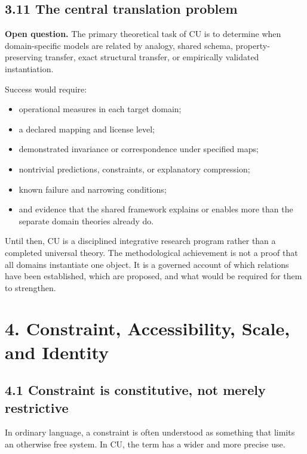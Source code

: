 \documentclass[
  11pt,
]{article}
\providecommand{\tightlist}{%
  \setlength{\itemsep}{0pt}\setlength{\parskip}{0pt}}
\begin{document}
\subsection{3.11 The central translation
problem}\label{the-central-translation-problem}

\textbf{Open question.} The primary theoretical task of CU is to
determine when domain-specific models are related by analogy, shared
schema, property-preserving transfer, exact structural transfer, or
empirically validated instantiation.

Success would require:

\begin{itemize}
\tightlist
\item
  operational measures in each target domain;
\item
  a declared mapping and license level;
\item
  demonstrated invariance or correspondence under specified maps;
\item
  nontrivial predictions, constraints, or explanatory compression;
\item
  known failure and narrowing conditions;
\item
  and evidence that the shared framework explains or enables more than
  the separate domain theories already do.
\end{itemize}

Until then, CU is a disciplined integrative research program rather than
a completed universal theory. The methodological achievement is not a
proof that all domains instantiate one object. It is a governed account
of which relations have been established, which are proposed, and what
would be required for them to strengthen.

\section{4. Constraint, Accessibility, Scale, and
Identity}\label{constraint-accessibility-scale-and-identity}

\subsection{4.1 Constraint is constitutive, not merely
restrictive}\label{constraint-is-constitutive-not-merely-restrictive}

In ordinary language, a constraint is often understood as something that
limits an otherwise free system. In CU, the term has a wider and more
precise use.
\end{document}
